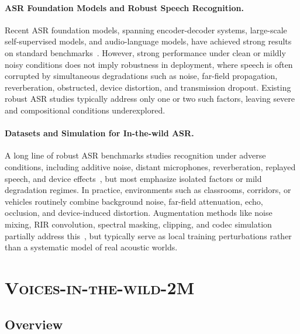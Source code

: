 \documentclass{llmxive}
\begin{document}
\paragraph{ASR Foundation Models and Robust Speech Recognition.}
Recent ASR foundation models, spanning encoder-decoder systems, large-scale self-supervised models, and audio-language models, have achieved strong results on standard benchmarks~\citep{whisper, fireredasr2s, qwen3-asr, funasr, qwen2.5omni, qwen3-omni, Kimi-Audio, stepaudio2}. However, strong performance under clean or mildly noisy conditions does not imply robustness in deployment, where speech is often corrupted by simultaneous degradations such as noise, far-field propagation, reverberation, obstructed, device distortion, and transmission dropout. Existing robust ASR studies typically address only one or two such factors, leaving severe and compositional conditions underexplored.
\vspace{-4mm}
\paragraph{Datasets and Simulation for In-the-wild ASR.}
A long line of robust ASR benchmarks studies recognition under adverse conditions, including additive noise, distant microphones, reverberation, replayed speech, and device effects~\citep{Noizeus, CHIME4, VOICES, DAPS, ted-lium, commonvoice, voxpopuli}, but most emphasize isolated factors or mild degradation regimes. In practice, environments such as classrooms, corridors, or vehicles routinely combine background noise, far-field attenuation, echo, occlusion, and device-induced distortion. Augmentation methods like noise mixing, RIR convolution, spectral masking, clipping, and codec simulation partially address this~\citep{MUSAN, DNS, ko2015audio, ko2017audio, parada2022pmctpatchedmulticonditiontraining}, but typically serve as local training perturbations rather than a systematic model of real acoustic worlds.



\vspace{-2mm}
\section{ \textsc{Voices-in-the-wild-2M} }
\vspace{-3mm}
\subsection{Overview}
\vspace{-2mm}
\end{document}

